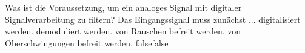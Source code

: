     {Was ist die Voraussetzung, um ein analoges Signal mit digitaler Signalverarbeitung zu filtern? Das Eingangssignal muss zunächst ...}
    {digitalisiert werden.}
    {demoduliert werden.}
    {von Rauschen befreit werden.}
    {von Oberschwingungen befreit werden.}
    {false}{false}
